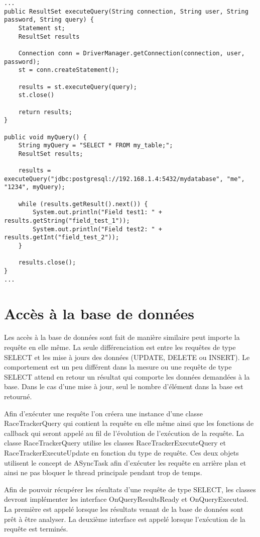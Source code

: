 \begin{lstlisting}[style=JavaStyle]
...
public ResultSet executeQuery(String connection, String user, String password, String query) {
	Statement st;
	ResultSet results

	Connection conn = DriverManager.getConnection(connection, user, password);
	st = conn.createStatement();
	
	results = st.executeQuery(query);
	st.close()	
	
	return results;
}

public void myQuery() {
	String myQuery = "SELECT * FROM my_table;";
	ResultSet results;
	
	results = executeQuery("jdbc:postgresql://192.168.1.4:5432/mydatabase", "me", "1234", myQuery);
	
	while (results.getResult().next()) {
		System.out.println("Field test1: " + results.getString("field_test_1"));
		System.out.println("Field test2: " + results.getInt("field_test_2"));
	}
	
	results.close();	
}
...
\end{lstlisting}

\section{Accès à la base de données}

Les accès à la base de données sont fait de manière similaire peut importe la requête en elle même. La seule différenciation est entre les requêtes de type SELECT et les mise à jours des données (UPDATE, DELETE ou INSERT). Le comportement est un peu différent dans la mesure ou une requête de type SELECT attend en retour un résultat qui comporte les données demandées à la base. Dans le cas d'une mise à jour, seul le nombre d'élément dans la base est retourné.

Afin d'exécuter une requête l'on créera une instance d'une classe RaceTrackerQuery qui contient la requête en elle même ainsi que les fonctions de callback qui seront appelé au fil de l'évolution de l'exécution de la requête. La classe RaceTrackerQuery utilise les classes RaceTrackerExecuteQuery et RaceTrackerExecuteUpdate en fonction du type de requête. Ces deux objets utilisent le concept de ASyncTask afin d'exécuter les requête en arrière plan et ainsi ne pas bloquer le thread principale pendant trop de temps.

Afin de pouvoir récupérer les résultats d'une requête de type SELECT, les classes devront implémenter les interface OnQueryResultsReady et OnQueryExecuted. La première est appelé lorsque les résultats venant de la base de données sont prêt à être analyser. La deuxième interface est appelé lorsque l'exécution de la requête est terminés.


